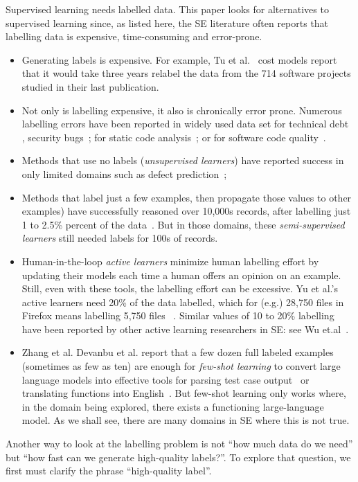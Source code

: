 Supervised learning needs labelled data.
This paper looks for alternatives to supervised learning since,
as listed here,  the SE literature often reports that labelling data is expensive, time-consuming and error-prone.   
\begin{itemize}
\item  
Generating    labels is expensive.
For example, Tu et al.~\cite{tu2020better} cost models report
that it would take   three years relabel the data
from the 714 software projects studied in their  last publication.
\item Not only is labelling expensive, it also is chronically error prone. Numerous labelling errors have been reported in widely used data set for technical debt~\cite{9226105} , security bugs~\cite{ 9371393}; for   static code analysis~\cite{10.1145/3510003.3510214}; or for software code quality~\cite{Shepperd13}.
\item Methods that use no labels ({\em unsupervised learners})
have reported   success in only limited domains such as defect prediction~\cite{XU2021110862};
\item Methods that label just a few examples,  then propagate those values to other examples) have successfully reasoned over 10,000s   records, after labelling just 1 to 2.5\% percent of the data~\cite{10109333,majumder2024less}.
But in those domains, these {\em semi-supervised learners}  still needed
labels for 100s of records.
\item  Human-in-the-loop  {\em active learners}  
minimize human labelling effort by updating their models
each time a human offers an opinion on an example.
Still, even with these tools, the labelling effort can be excessive.
Yu et al.'s active learners need 20\% of the data
labelled, which for (e.g.) 28,750 files in Firefox means labelling 5,750 files ~\cite{yu2019fast2}. Similar values of 10 to 20\% labelling
have been reported by other active learning researchers in SE:
see   Wu et.al~\cite{WU2021106530}.
\item 
Zhang et al.  
Devanbu et al. report that a few dozen full labeled examples (sometimes as few as ten)  are enough for {\em few-shot learning}
to convert large  language models into effective tools
for  
 parsing   test  case output~\cite{le2023log} or translating functions into English~\cite{10.1145/3551349.3559555}. But few-shot learning
 only works where, in the domain being explored, there exists
 a functioning large-language model. As we shall see, there are many domains in SE where this is not true.
\end{itemize}
Another way to look at the labelling problem is not ``how much data do we need'' but ``how fast can we generate high-quality labels?''.  
To explore that question, we first must clarify the phrase ``high-quality label''.

